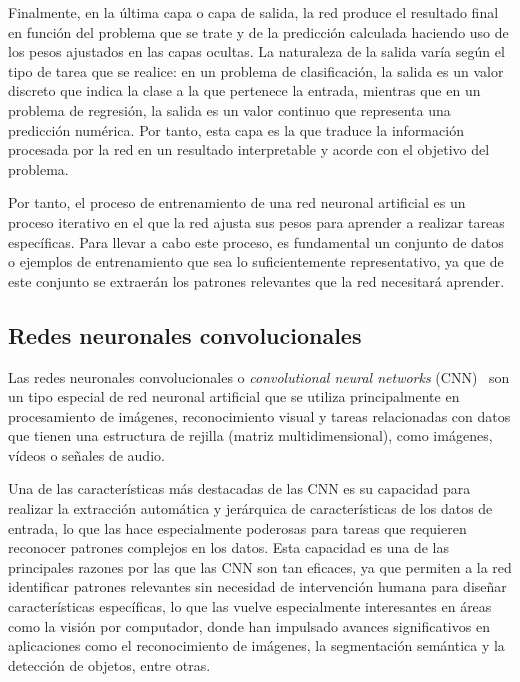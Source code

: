 Finalmente, en la última capa o capa de salida, la red produce el resultado final en función del problema que se trate y de la predicción calculada haciendo uso de los pesos ajustados en las capas ocultas. La naturaleza de la salida varía según el tipo de tarea que se realice: en un problema de clasificación, la salida es un valor discreto que indica la clase a la que pertenece la entrada, mientras que en un problema de regresión, la salida es un valor continuo que representa una predicción numérica. Por tanto, esta capa es la que traduce la información procesada por la red en un resultado interpretable y acorde con el objetivo del problema.\newline

Por tanto, el proceso de entrenamiento de una red neuronal artificial es un proceso iterativo en el que la red ajusta sus pesos para aprender a realizar tareas específicas. Para llevar a cabo este proceso, es fundamental un conjunto de datos o ejemplos de entrenamiento que sea lo suficientemente representativo, ya que de este conjunto se extraerán los patrones relevantes que la red necesitará aprender.\newline

\subsection{Redes neuronales convolucionales}\label{subsec:redes-neuronales-convolucionales}

Las redes neuronales convolucionales o \emph{convolutional neural networks} (CNN)~\cite{LeCun1989, LeCun1998} son un tipo especial de red neuronal artificial que se utiliza principalmente en procesamiento de imágenes, reconocimiento visual y tareas relacionadas con datos que tienen una estructura de rejilla (matriz multidimensional), como imágenes, vídeos o señales de audio.\newline

Una de las características más destacadas de las CNN es su capacidad para realizar la extracción automática y jerárquica de características de los datos de entrada, lo que las hace especialmente poderosas para tareas que requieren reconocer patrones complejos en los datos. Esta capacidad es una de las principales razones por las que las CNN son tan eficaces, ya que permiten a la red identificar patrones relevantes sin necesidad de intervención humana para diseñar características específicas, lo que las vuelve especialmente interesantes en áreas como la visión por computador, donde han impulsado avances significativos en aplicaciones como el reconocimiento de imágenes, la segmentación semántica y la detección de objetos, entre otras.\newline

